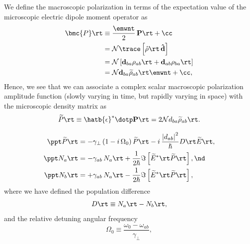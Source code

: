 We define the macroscopic polarization in terms of the expectation value of the microscopic electric dipole moment operator as
 \begin{equation} \label{eqn:tls_bmc_p_def}
 \begin{split}
 \bmc{P}\rt &\equiv \frac{\emwnt}{2}\, \mathbf{P}\rt + \cc \\
 &= \mathcal{N} \trace\left[ \hat{\rho}\rt\, \mathbf{\hat{d}} \right] \\
 &= \mathcal{N} \left[ \mathbf{d}_{b a} \rho_{a b}\rt + \mathbf{d}_{a b} \rho_{b a}\rt \right] \\
 &= \mathcal{N} \mathbf{d}_{b a} \widetilde{\rho}_{a b}\rt \emwnt + \cc ,
 \end{split}
 \end{equation}
Hence, we see that we can associate a complex scalar macroscopic polarization amplitude function (slowly varying in time, but rapidly varying in space) with the microscopic density matrix as
 \begin{equation} \label{eqn:tls_prt_rwa_def}
\widetilde{P}\rt \equiv \hatb{\epsilon}^* \dotp \mathbf{P}\rt = 2 \mathcal{N} d_{b a} \widetilde{\rho}_{a b}\rt .
 \end{equation}

 \begin{subequations} \label{eqn:tls_mbe_rwa}
 \begin{align}
\label{eqn:tls_mbe_rwa_pol} \ppt \widetilde{P}\rt &= -\gamma_\perp \left( 1 - i\, \Omega_0 \right) \widetilde{P}\rt - i\, \frac{\left|d_{a b}\right|^2}{\hslash} D\rt \widetilde{E}\rt , \\
\label{eqn:tls_mbe_rwa_pop_a} \ppt N_a\rt &= -\gamma_{a b}\, N_a\rt + \frac{1}{2 \hslash} \Im \left[ \widetilde{E}^\ast\rt \widetilde{P}\rt \right] , \nd \\
\label{eqn:tls_mbe_rwa_pop_b} \ppt N_b\rt &= +\gamma_{a b}\, N_a\rt - \frac{1}{2 \hslash} \Im \left[ \widetilde{E}^\ast\rt \widetilde{P}\rt \right] ,
 \end{align}
 \end{subequations}
where we have defined the population difference
 \begin{equation} \label{eqn:tls_pop_inv_def}
D\rt \equiv N_a\rt - N_b\rt ,
 \end{equation}
and the relative detuning angular frequency
 \begin{equation} \label{eqn:tls_omega_0_def}
\Omega_0 \equiv \frac{\omega_0 - \omega_{a b}}{\gamma_\perp} ,
 \end{equation}


